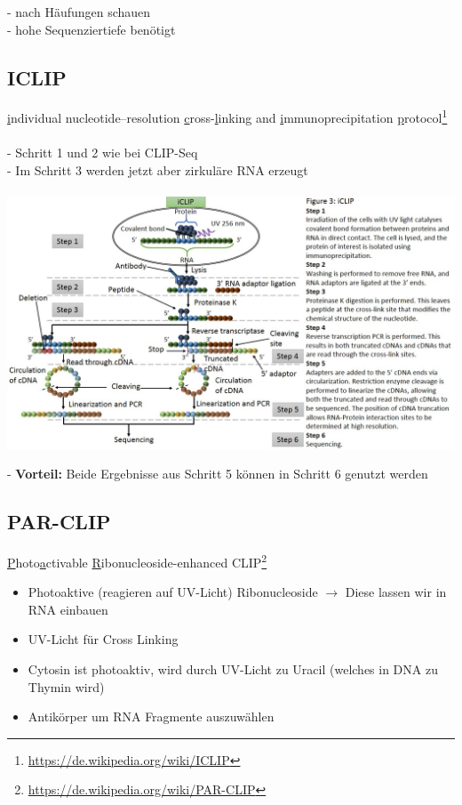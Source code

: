  - nach Häufungen schauen\\
 - hohe Sequenziertiefe benötigt

\subsection{ICLIP}
\underline{i}ndividual nucleotide–resolution \underline{c}ross-\underline{l}inking and \underline{i}mmunoprecipitation \underline{p}rotocol\footnote{\url{https://de.wikipedia.org/wiki/ICLIP}}
\\\\
- Schritt 1 und 2 wie bei CLIP-Seq\\
- Im Schritt 3 werden jetzt aber zirkuläre RNA erzeugt
\\\\
\includegraphics[width=1.2\textwidth]{lectures/160429/pix/iclip.png}

 - \textbf{Vorteil:} Beide Ergebnisse aus Schritt 5 können in Schritt 6 genutzt werden
\newpage
\subsection{PAR-CLIP}
\underline{P}hoto\underline{a}ctivable \underline{R}ibonucleoside-enhanced CLIP\footnote{\url{https://de.wikipedia.org/wiki/PAR-CLIP}}

\begin{itemize}
	\item Photoaktive (reagieren auf UV-Licht) Ribonucleoside $\rightarrow$ Diese lassen wir in RNA einbauen
	\item UV-Licht für Cross Linking
	\item Cytosin ist photoaktiv, wird durch UV-Licht zu Uracil (welches in DNA zu Thymin wird)
	\item Antikörper um RNA Fragmente auszuwählen
\end{itemize}

